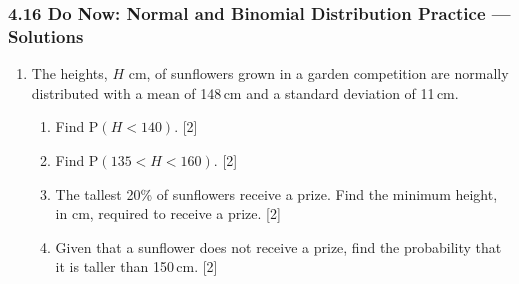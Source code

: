 \documentclass[12pt, twoside]{article}
\begin{document}
\subsubsection*{4.16 Do Now: Normal and Binomial Distribution Practice --- Solutions}
\begin{enumerate}[itemsep=0.1cm]

\item The heights, $H$ cm, of sunflowers grown in a garden competition are normally distributed
with a mean of 148\,cm and a standard deviation of 11\,cm.

\begin{enumerate}[itemsep=0.25cm]
    \item Find $\mathrm{P}(H < 140)$. \hfill [2]
    \item Find $\mathrm{P}(135 < H < 160)$. \hfill [2]
    \item The tallest 20\% of sunflowers receive a prize. Find the minimum height, in cm,
    required to receive a prize. \hfill [2]
    \item Given that a sunflower does not receive a prize, find the probability that it is
    taller than 150\,cm. \hfill [2]
\end{enumerate}

\vfill


\end{enumerate}
\end{document}
